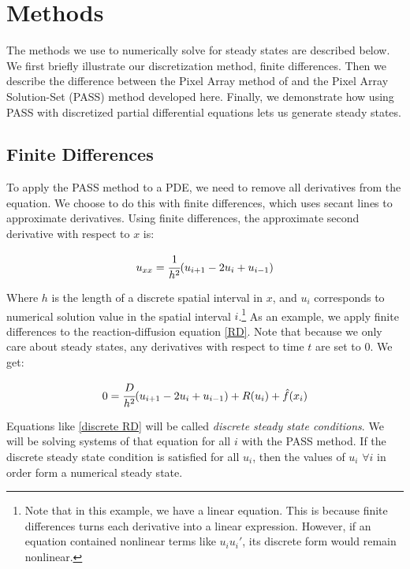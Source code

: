\documentclass[11pt]{article}
\begin{document}
\section{Methods}\label{sec:methods}

The methods we use to numerically solve for steady states are described below. We first briefly illustrate our discretization method, finite differences. Then we describe the difference between the Pixel Array method of \citep{Introduction_to_PA} and the Pixel Array Solution-Set (PASS) method developed here. Finally, we demonstrate how using PASS with discretized partial differential equations lets us generate steady states.

\subsection{Finite Differences}

To apply the PASS method to a PDE, we need to remove all derivatives from the equation. We choose to do this with finite differences, which uses secant lines to approximate derivatives. Using finite differences, the approximate second derivative with respect to $x$ is:

\begin{equation}
    \label{FD second order}
    u_{xx} = \cfrac{1}{h^2} (u_{i+1} - 2u_i + u_{i-1})
\end{equation}

\noindent Where $h$ is the length of a discrete spatial interval in $x$, and $u_i$ corresponds to numerical solution value in the spatial interval $i$.\footnote{Note that in this example, we have a linear equation. This is because finite differences turns each derivative into a linear expression. However, if an equation contained nonlinear terms like $u_iu_i'$, its discrete form would remain nonlinear.} As an example, we apply finite differences to the reaction-diffusion equation \eqref{RD}. Note that because we only care about steady states, any derivatives with respect to time $t$ are set to 0. We get:

\begin{equation}
    \label{discrete RD}
    0 = \cfrac{D}{h^2} (u_{i+1} - 2u_i + u_{i-1}) + R(u_i) + \hat{f}(x_i)
\end{equation}

Equations like \eqref{discrete RD} will be called \textit{discrete steady state conditions}. We will be solving systems of that equation for all $i$ with the PASS method. If the discrete steady state condition is satisfied for all $u_i$, then the values of $u_i$ $\forall i$ in order form a numerical steady state.
\end{document}
